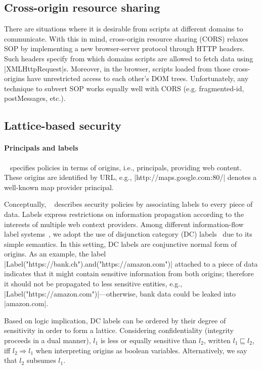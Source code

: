 \subsection{Cross-origin resource sharing } 


There are situations where it is desirable from scripts at different domains to
communicate. With this in mind, cross-origin resource sharing (CORS) relaxes SOP
by implementing a new browser-server protocol through HTTP headers.  Such
headers specify from which domains scripts are allowed to fetch data 
using \js|XMLHttpRequest|s. Moreover, in the browser, scripts loaded from
those cross-origins have unrestricted access to each other's DOM
trees. Unfortunately, any technique to subvert SOP works equally well with CORS 
(e.g. fragmented-id, postMessages, etc.).


\subsection{Lattice-based security}

\paragraph{Principals and labels}
\sys~ specifies policies in terms of origins, i.e., principals, providing web content.  
These origins are identified by URL, e.g., 
\js|http://maps.google.com:80/| denotes a well-known map provider principal. 

Conceptually, \sys~ describes security policies by associating labels to every
piece of data. Labels express restrictions on information propagation according
to the interests of multiple web context providers. Among different
information-flow label systems~\cite{CSF2013}, we adopt the use of disjunction
category (DC) labels~\cite{TODO} due to its simple semantics. 
In this setting, DC labels are conjunctive normal form of
origins. As an example, the label
\js|Label("https://bank.ch").and("https://amazon.com")| attached to a piece
of data indicates that it might contain sensitive information from both origins;
therefore it
should not be propagated to less sensitive entities, e.g.,
\js|Label("https://amazon.com")|---otherwise, bank data could be leaked into
\js|amazon.com|. 

Based on logic implication, DC labels can be ordered by their degree of
sensitivity in order to form a lattice. Considering confidentiality
(integrity proceeds in a dual manner), $l_1$ is less or equally sensitive than
$l_2$, written $l_1 \sqsubseteq l_2$, iff $l_2 \Rightarrow l_1$ when interpreting
origins as boolean variables. Alternatively, we say that $l_2$ subsumes $l_1$. 

